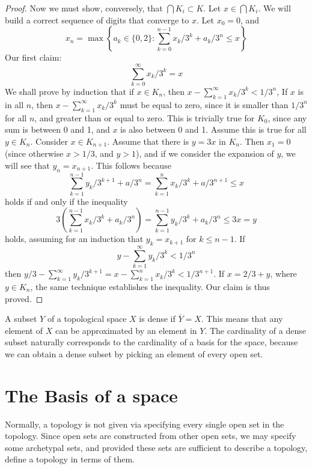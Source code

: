 \begin{proof}
    Now we must show, conversely, that $\bigcap K_i \subset K$. Let $x \in \bigcap K_i$. We will build a correct sequence of digits that converge to $x$. Let $x_0 = 0$, and
    \[ x_n = \max \left\{ a_k \in \{0,2\} : \sum_{k = 0}^{n-1} x_k/3^k + a_k/3^n \leq x \right\} \]
    Our first claim:
    \[ \sum_{k = 0}^\infty x_k/3^k = x \]
    We shall prove by induction that if $x \in K_n$, then $x - \sum_{k = 1}^\infty x_k/3^k < 1/3^n$, If $x$ is in all $n$, then $x - \sum_{k = 1}^\infty x_k/3^k$ must be equal to zero, since it is smaller than $1/3^n$ for all $n$, and greater than or equal to zero. This is trivially true for $K_0$, since any sum is between 0 and 1, and $x$ is also between 0 and 1. Assume this is true for all $y \in K_n$. Consider $x \in K_{n+1}$. Assume that there is $y = 3x$ in $K_n$. Then $x_1 = 0$ (since otherwise $x > 1/3$, and $y > 1$), and if we consider the expansion of $y$, we will see that $y_n = x_{n+1}$. This follows because
    \[ \sum_{k = 1}^{n-1} y_k/3^{k+1} + a/3^n = \sum_{k = 1}^{n} x_k/3^k + a/3^{n+1} \leq x \]
    holds if and only if the inequality
    \[ 3\left(\sum_{k = 1}^{n-1} x_k/3^k + a_k/3^n\right) = \sum_{k = 1}^{n-1} y_k/3^k + a_k/3^n \leq 3x = y \]
    holds, assuming for an induction that $y_k = x_{k+1}$ for $k \leq n-1$. If
    \[ y - \sum_{k = 1}^\infty y_k/3^k < 1/3^n \]
    then $y/3 - \sum_{k = 1}^\infty y_k/3^{k+1} = x - \sum_{k = 1}^n x_k/3^k < 1/3^{n+1}$. If $x = 2/3 + y$, where $y \in K_n$, the same technique establishes the inequality. Our claim is thus proved.
\end{proof}

A subset $Y$ of a topological space $X$ is dense if $\overline{Y} = X$. This means that any element of $X$ can be approximated by an element in $Y$. The cardinality of a dense subset naturally corresponds to the cardinality of a basis for the space, because we can obtain a dense subset by picking an element of every open set.

\section{The Basis of a space}

Normally, a topology is not given via specifying every single open set in the topology. Since open sets are constructed from other open sets, we may specify some archetypal sets, and provided these sets are sufficient to describe a topology, define a topology in terms of them.

